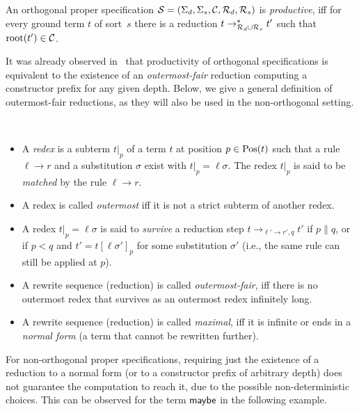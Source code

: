 \documentclass{eptcs}
\begin{document}
\begin{proposition}
\label{prop:OrthoProd}
An orthogonal proper specification $\mathcal{S} = (\Sigma_d,\Sigma_s,\mathcal{C},\mathcal{R}_d,\mathcal{R}_s)$ is 
\emph{productive},
iff for every ground term $t$ of sort~$s$ there is a reduction
$t \to_{\mathcal{R}_d \cup \mathcal{R}_s}^* t'$ such that $\mathrm{root}(t') \in \mathcal{C}$.
\end{proposition}


It was already observed in~\cite{EGH09,End10} that productivity of orthogonal
specifications is equivalent to the existence of an \emph{outermost-fair}
reduction computing a constructor prefix for any given depth. Below, we give a
general definition of outermost-fair reductions, as they will
also be used in the non-orthogonal setting.

\pagebreak[2]
\begin{definition}
\label{def:OutFair}
~
\begin{itemize}
\item
A \emph{redex} is a subterm $t|_p$ of a term $t$ at position $p \in \mathrm{Pos}(t)$
such that a rule $\ell \to r$ and a substitution $\sigma$ exist with
$t|_p = \ell\sigma$.
The redex $t|_p$ is said to be \emph{matched} by the rule $\ell \to r$.

\item
A redex is called \emph{outermost} iff it is not a strict subterm of another
redex.

\item
A redex $t|_p = \ell\sigma$ is said to \emph{survive} a reduction step
$t \to_{\ell' \to r', q} t'$ if $p \parallel q$, or if $p < q$ and
$t' = t[\ell\sigma']_p$ for some substitution $\sigma'$
(i.e., the same rule can still be applied at $p$).


\item
A rewrite sequence (reduction) is called \emph{outermost-fair}, iff there is no
outermost redex that survives as an outermost redex infinitely long.

\item
A rewrite sequence (reduction) is called \emph{maximal}, iff it is infinite or
ends in a \emph{normal form} (a term that cannot be rewritten further).
\end{itemize}
\end{definition}


For non-orthogonal proper specifications, requiring just the existence of a
reduction to a normal form (or to a constructor prefix of arbitrary depth)
does not guarantee the computation to reach it, due to the possible
non-deterministic choices. This can be observed for the term $\mathsf{maybe}$
in the following example.
\end{document}
